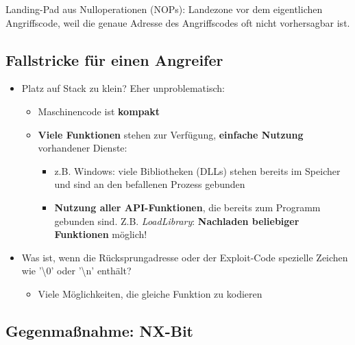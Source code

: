 \documentclass[openany]{book}
\begin{document}
Landing-Pad aus Nulloperationen (NOPs): Landezone vor dem eigentlichen Angriffscode, weil die genaue Adresse des Angriffscodes oft nicht vorhersagbar ist.

\subsection{Fallstricke für einen Angreifer}

\begin{itemize}
    \item Platz auf Stack zu klein? Eher unproblematisch:
    \begin{itemize}
        \item Maschinencode ist \textbf{kompakt}
        \item \textbf{Viele Funktionen} stehen zur Verfügung, \textbf{einfache Nutzung} vorhandener Dienste:
        \begin{itemize}
            \item z.B. Windows: viele Bibliotheken (DLLs) stehen bereits im Speicher und sind an den befallenen Prozess gebunden
            \item \textbf{Nutzung aller API-Funktionen}, die bereits zum Programm gebunden sind. Z.B. \textit{LoadLibrary}: \textbf{Nachladen beliebiger Funktionen} möglich!
        \end{itemize}
    \end{itemize}
    \item Was ist, wenn die Rücksprungadresse oder der Exploit-Code spezielle Zeichen wie '\textbackslash 0' oder '\textbackslash n' enthält?
    \begin{itemize}
        \item Viele Möglichkeiten, die gleiche Funktion zu kodieren
    \end{itemize}
\end{itemize}

\subsection{Gegenmaßnahme: NX-Bit}
\end{document}
